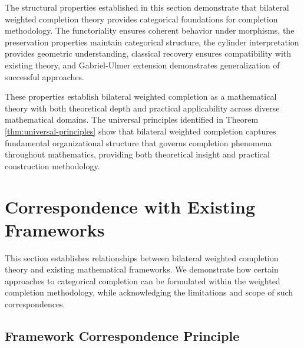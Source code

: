 \documentclass[11pt]{article}
\theoremstyle{plain}
\theoremstyle{definition}
\theoremstyle{remark}
\begin{document}
The structural properties established in this section demonstrate that bilateral weighted completion theory provides categorical foundations for completion methodology. The functoriality ensures coherent behavior under morphisms, the preservation properties maintain categorical structure, the cylinder interpretation provides geometric understanding, classical recovery ensures compatibility with existing theory, and Gabriel-Ulmer extension demonstrates generalization of successful approaches.

These properties establish bilateral weighted completion as a mathematical theory with both theoretical depth and practical applicability across diverse mathematical domains. The universal principles identified in Theorem \ref{thm:universal-principles} show that bilateral weighted completion captures fundamental organizational structure that governs completion phenomena throughout mathematics, providing both theoretical insight and practical construction methodology.

\section{Correspondence with Existing Frameworks}

This section establishes relationships between bilateral weighted completion theory and existing mathematical frameworks. We demonstrate how certain approaches to categorical completion can be formulated within the weighted completion methodology, while acknowledging the limitations and scope of such correspondences.

\subsection{Framework Correspondence Principle}
\end{document}
